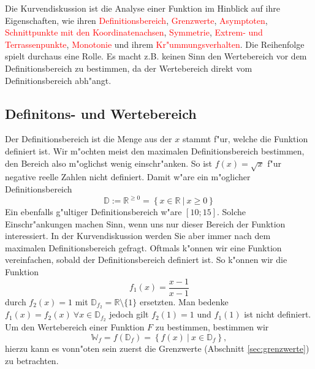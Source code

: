 Die Kurvendiskussion ist die Analyse einer Funktion im Hinblick auf ihre Eigenschaften, wie ihren \textcolor{red}{Definitionsbereich}, \textcolor{red}{Grenzwerte}, \textcolor{red}{Asymptoten}, \textcolor{red}{Schnittpunkte mit den Koordinatenachsen}, \textcolor{red}{Symmetrie}, \textcolor{red}{Extrem- und Terrassenpunkte}, \textcolor{red}{Monotonie} und ihrem \textcolor{red}{Kr"ummungsverhalten}. Die Reihenfolge spielt durchaus eine Rolle. Es macht z.B. keinen Sinn den Wertebereich vor dem Definitionsbereich zu bestimmen, da der Wertebereich direkt vom Definitionsbereich abh"angt.

\subsection{Definitons- und Wertebereich}
Der Definitionsbereich ist die Menge aus der $x$ stammt f"ur, welche die Funktion definiert ist. Wir m"ochten meist den maximalen Definitionsbereich bestimmen, den Bereich also m"oglichst wenig einschr"anken. So ist $f(x) = \sqrt{x}$ f"ur negative reelle Zahlen nicht definiert. Damit w"are ein m"oglicher Definitionsbereich 
\begin{equation*}
\mathbb{D} := \mathbb{R}^{\geq 0} = \left\{x \in \mathbb{R} \ | \ x \geq 0 \right\}
\end{equation*}
Ein ebenfalls g"ultiger Definitionsbereich w"are $\left[10;15\right]$. Solche Einschr"ankungen machen Sinn, wenn uns nur dieser Bereich der Funktion interessiert. In der Kurvendiskussion werden Sie aber immer nach dem maximalen Definitionsbereich gefragt. Oftmals k"onnen wir eine Funktion vereinfachen, sobald der Definitionsbereich definiert ist. So k"onnen wir die Funktion
\begin{equation*}
f_1(x) = \frac{x-1}{x-1}
\end{equation*}
durch $f_2(x) = 1$ mit $\mathbb{D}_{f_2} = \mathbb{R} \setminus \{1\}$ ersetzten. Man bedenke $f_1(x) = f_2(x) \ \forall x \in \mathbb{D}_{f_2}$ jedoch gilt $f_2(1) = 1$ und $f_1(1)$ ist nicht definiert. Um den Wertebereich einer Funktion $F$ zu bestimmen, bestimmen wir
\begin{equation*}
\mathbb{W}_f = f(\mathbb{D}_f) = \left\{f(x) \ | \ x \in \mathbb{D}_f \right\},
\end{equation*}
hierzu kann es vonn"oten sein zuerst die Grenzwerte (Abschnitt \ref{sec:grenzwerte}) zu betrachten.

